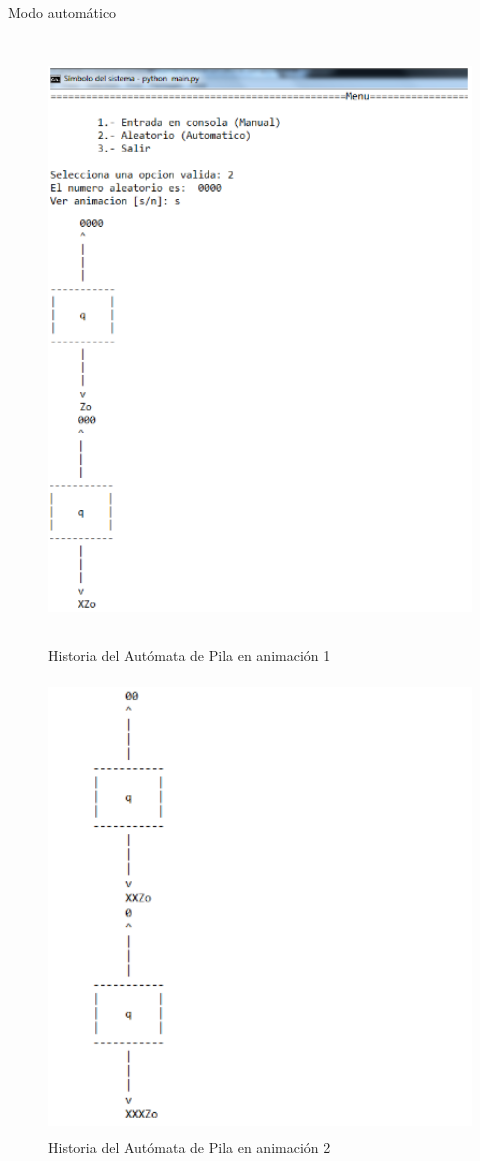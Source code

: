 	\newpage
	{\large Modo automático}
	\begin{figure}[H]
		\begin{center}
			\includegraphics[width=14cm, height=16cm]{img/pila-automatico-consola1.png}
			\caption{Historia del Autómata de Pila en animación 1}
			\label{fig:pila2a}
		\end{center}
	\end{figure}
	\begin{figure}[H]
		\begin{center}
			\includegraphics[width=14cm, height=12cm]{img/pila-automatico-consola2.png}
			\caption{Historia del Autómata de Pila en animación 2}
			\label{fig:pila2b}
		\end{center}
	\end{figure}
